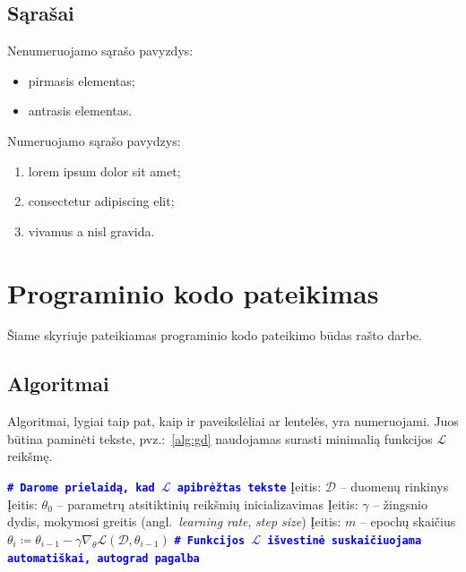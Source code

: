 \documentclass[]{VUMIFTemplateClass}
\begin{document}
\subsection{Sąrašai}

Nenumeruojamo sąrašo pavyzdys:
\begin{itemize}
    \item pirmasis elementas;
    \item antrasis elementas.
\end{itemize}

Numeruojamo sąrašo pavydzys:
\begin{enumerate}
    \item lorem ipsum dolor sit amet;
    \item consectetur adipiscing elit;
    \item vivamus a nisl gravida.
\end{enumerate}


\section{Programinio kodo pateikimas}
Šiame skyriuje pateikiamas programinio kodo pateikimo būdas rašto darbe.

\subsection{Algoritmai}

Algoritmai, lygiai taip pat, kaip ir paveikslėliai ar lentelės, yra numeruojami.
Juos būtina paminėti tekste, pvz.:~\ref{alg:gd} naudojamas surasti minimalią funkcijos $\mathcal{L}$ reikšmę.

\begin{algorithm}[h]
\caption{Gradientinio nusileidimo pseudokodas}\label{alg:gd}
\begin{algorithmic}[1]
    \STATE \textcolor{blue}{\texttt{\textbf{\# Darome prielaidą, kad $\mathcal{L}$ apibrėžtas tekste}}}
        \STATE Įeitis: $\mathcal{D}$ -- duomenų rinkinys
        \STATE Įeitis: $\theta_0$ -- parametrų atsitiktinių reikšmių inicializavimas
        \STATE Įeitis: $\gamma$ -- žingsnio dydis, mokymosi greitis (angl.~\textit{learning rate}, \textit{step size})
        \STATE Įeitis: $m$ -- epochų skaičius
            \STATE $\theta_i \coloneq \theta_{i-1} - \gamma \nabla_\theta \mathcal{L}(\mathcal{D}, \theta_{i-1})$
            \STATE \textcolor{blue}{\texttt{\textbf{\# Funkcijos $\mathcal{L}$ išvestinė suskaičiuojama automatiškai, autograd pagalba}}}
        \ENDFOR
\end{algorithmic}
\end{algorithm}
\end{document}
